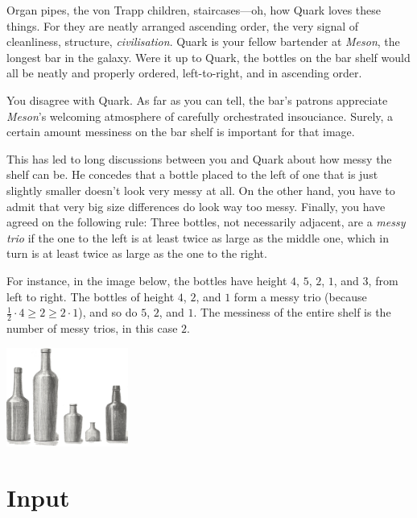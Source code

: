 

\noindent
Organ pipes, the von Trapp children, staircases---oh, how Quark loves these things.
For they are neatly arranged ascending order, the very signal of cleanliness, structure, \emph{civilisation}.
Quark is your fellow bartender at \emph{Meson}, the longest bar in the galaxy.
Were it up to Quark, the bottles on the bar shelf would all be neatly and properly ordered, left-to-right, and in ascending order.

You disagree with Quark.
As far as you can tell, the bar's patrons appreciate \emph{Meson}'s welcoming atmosphere of carefully orchestrated insouciance. 
Surely, a certain amount messiness on the bar shelf is important for that image.

This has led to long discussions between you and Quark about how messy the shelf can be.
He concedes that a bottle placed to the left of one that is just slightly smaller doesn't look very messy at all.
On the other hand, you have to admit that very big size differences do look way too messy.
Finally, you have agreed on the following rule:
Three bottles, not necessarily adjacent, are a \emph{messy trio} if the one to the left is at least twice as large as the middle one, which in turn is at least twice as large as the one to the right.

\medskip
For instance, in the image below, the bottles have height $4$, $5$, $2$, $1$, and $3$, from left to right.
The bottles of height $4$, $2$, and $1$ form a messy trio (because $\frac12 \cdot 4 \geq 2\geq 2\cdot  1$), and so do $5$, $2$, and $1$.
The messiness of the entire shelf is the number of messy trios, in this case $2$.

\medskip
\includegraphics[width= 0.3\textwidth]{img/messy_bottles.png}



\section*{Input}

